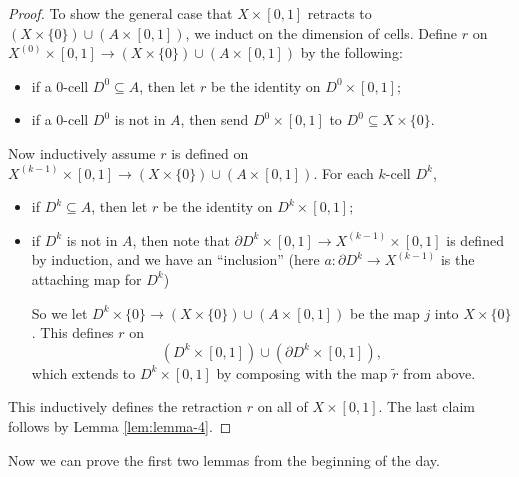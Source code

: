\begin{proof}
  To show the general case that
  $X \times [0, 1]$ retracts to
  $(X \times \{0\}) \cup (A \times [0, 1])$, we induct
  on the dimension of cells. Define
  $r$ on $X^{(0)} \times [0, 1] \to (X \times \{0\}) \cup (A \times [0, 1])$
  by the following:
  \begin{itemize}
    \item if a $0$-cell $D^0 \subseteq A$, then
      let $r$ be the identity on $D^0 \times [0, 1]$;
    \item if a $0$-cell $D^0$ is not in $A$, then
      send $D^0 \times [0, 1]$ to
      $D^0 \subseteq X \times \{0\}$.
  \end{itemize}
  Now inductively assume $r$ is defined on
  $X^{(k - 1)} \times [0, 1] \to (X \times \{0\}) \cup (A \times [0, 1])$.
  For each $k$-cell $D^k$,
  \begin{itemize}
    \item if $D^k \subseteq A$, then
      let $r$ be the identity on $D^k \times [0, 1]$;
    \item if $D^k$ is not in $A$, then note that
      $\partial D^k \times [0, 1] \to X^{(k - 1)} \times [0, 1]$
      is defined by induction, and
      we have an ``inclusion'' (here
      $a : \partial D^k \to X^{(k - 1)}$ is the attaching map for $D^k$)
      \begin{center}
      \end{center}
    So we let $D^k \times \{0\} \to (X \times \{0\}) \cup (A \times [0, 1])$
    be the map $j$ into $X \times \{0\}$. This
    defines $r$ on
    \[
      (D^k \times [0, 1]) \cup (\partial D^k \times [0, 1]),
    \]
    which extends to $D^k \times [0, 1]$ by composing
    with the map $\widetilde{r}$ from above.
  \end{itemize}
  This inductively defines the retraction
  $r$ on all of $X \times [0, 1]$.
  The last claim follows by Lemma
  \ref{lem:lemma-4}.
\end{proof}

\begin{remark}
  Now we can prove the first two lemmas from the
  beginning of the day.
\end{remark}

